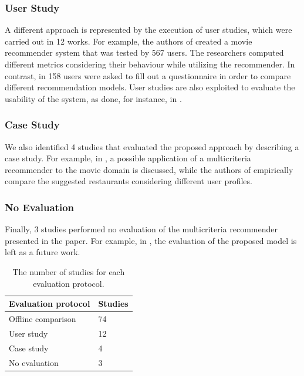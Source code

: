\subsubsection{User Study}

A different approach is represented by the execution of user studies, which were carried out in 12 works. For example, the authors of  created a movie recommender system that was tested by 567 users. The researchers computed different metrics considering their behaviour while utilizing the recommender. In contrast, in  158 users were asked to fill out a questionnaire in order to compare different recommendation models. User studies are also exploited to evaluate the usability of the system, as done, for instance, in .

\subsubsection{Case Study}

We also identified 4 studies that evaluated the proposed approach by describing a case study. For example, in , a possible application of a multicriteria recommender to the movie domain is discussed, while the authors of  empirically compare the suggested restaurants considering different user profiles.

\subsubsection{No Evaluation}

Finally, 3 studies performed no evaluation of the multicriteria recommender presented in the paper. For example, in , the evaluation of the proposed model is left as a future work.

\begin{table}
\centering
\begin{tabular}{@{}ll@{}}
\toprule
Evaluation protocol & Studies \\ \midrule
Offline comparison  & 74      \\
User study          & 12      \\
Case study          & 4       \\
No evaluation       & 3       \\ \bottomrule
\end{tabular}
\caption[Studies per evaluation protocol]{The number of studies for each evaluation protocol.}
\label{mcr:tab:protocols}
\end{table}


